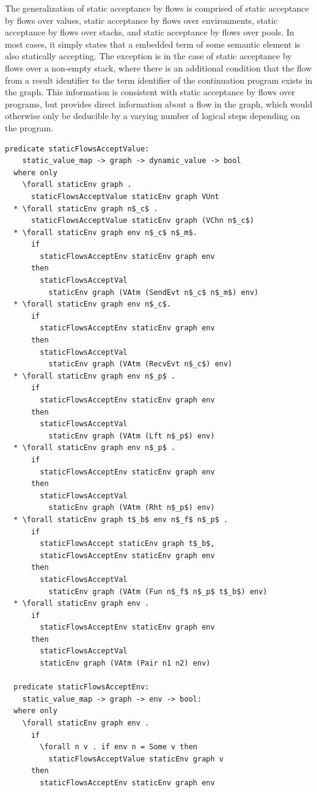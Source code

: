 \documentclass[letterpaper, 11pt]{extarticle}
\begin{document}
The generalization of static acceptance by flows is comprised of static acceptance by flows over values,
static acceptance by flows over environments, static acceptance by flows over stacks, and static
acceptance by flows over pools.
In most cases, it simply states that a embedded term of some semantic element is also statically
accepting. The exception is in the case of
static acceptance by flows over a non-empty stack, where
there is an additional condition that the flow
from a result identifier to the term identifier
of the continuation program exists in the graph.
This information is consistent with static
acceptance by flows over programs, but provides direct information about a flow in the
graph, which would otherwise only be deducible by a varying number of logical steps
depending on the program.

\begin{lstlisting}[language=logic, mathescape]
  predicate staticFlowsAcceptValue:
    static_value_map -> graph -> dynamic_value -> bool
  where only
    \forall staticEnv graph .
      staticFlowsAcceptValue staticEnv graph VUnt
  * \forall staticEnv graph n$_c$ .
      staticFlowsAcceptValue staticEnv graph (VChn n$_c$)
  * \forall staticEnv graph env n$_c$ n$_m$.
      if
        staticFlowsAcceptEnv staticEnv graph env 
      then 
        staticFlowsAcceptVal
          staticEnv graph (VAtm (SendEvt n$_c$ n$_m$) env)
  * \forall staticEnv graph env n$_c$.
      if
        staticFlowsAcceptEnv staticEnv graph env 
      then
        staticFlowsAcceptVal
          staticEnv graph (VAtm (RecvEvt n$_c$) env)
  * \forall staticEnv graph env n$_p$ .
      if
        staticFlowsAcceptEnv staticEnv graph env 
      then
        staticFlowsAcceptVal
          staticEnv graph (VAtm (Lft n$_p$) env)
  * \forall staticEnv graph env n$_p$ .
      if
        staticFlowsAcceptEnv staticEnv graph env
      then
        staticFlowsAcceptVal
          staticEnv graph (VAtm (Rht n$_p$) env)
  * \forall staticEnv graph t$_b$ env n$_f$ n$_p$ .
      if
        staticFlowsAccept staticEnv graph t$_b$, 
        staticFlowsAcceptEnv staticEnv graph env
      then
        staticFlowsAcceptVal
          staticEnv graph (VAtm (Fun n$_f$ n$_p$ t$_b$) env)
  * \forall staticEnv graph env . 
      if
        staticFlowsAcceptEnv staticEnv graph env
      then
        staticFlowsAcceptVal
        staticEnv graph (VAtm (Pair n1 n2) env)

  predicate staticFlowsAcceptEnv:
    static_value_map -> graph -> env -> bool: 
  where only 
    \forall staticEnv graph env .
      if
        \forall n v . if env n = Some v then
          staticFlowsAcceptValue staticEnv graph v
      then
        staticFlowsAcceptEnv staticEnv graph env


\end{lstlisting}
\end{document}
